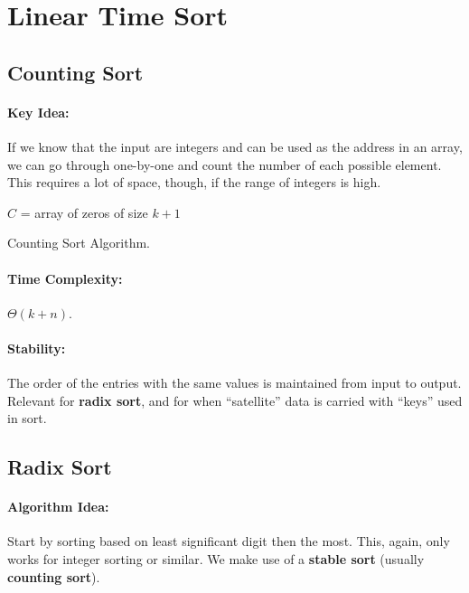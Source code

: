 \documentclass[a4paper,12pt]{report}
\begin{document}
\section{Linear Time Sort}

\subsection{Counting Sort}

\paragraph{Key Idea: } If we know that the input are integers and can be used as the address in an array, we can go through one-by-one and count the number of each possible element. This requires a lot of space, though, if the range of integers is high. 

\begin{algorithm}[H]
\SetAlgoLined
{}
\Output{}
	\BlankLine
	\BlankLine
	$C$ = array of zeros of size $k+1$\;



	\caption{Counting Sort Algorithm.}
\end{algorithm}
\paragraph{Time Complexity: } $\Theta(k+n)$.

\paragraph{Stability: } The order of the entries with the same values is maintained from input to output. Relevant for \textbf{radix sort}, and for when ``satellite'' data is carried with ``keys'' used in sort.



\subsection{Radix Sort}

\paragraph{Algorithm Idea: } Start by sorting based on least significant digit then the most. This, again, only works for integer sorting or similar. We make use of a \textbf{stable sort} (usually \textbf{counting sort}). 
\end{document}
